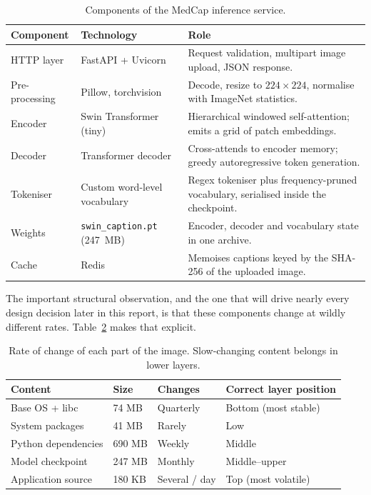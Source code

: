 \documentclass[10pt,a4paper]{article}
\newcommand{\cmd}[1]{\texttt{\small #1}}
\begin{document}
\begin{table}[htbp]
\centering
\caption{Components of the MedCap inference service.}
\label{tab:appcomp}
\footnotesize
\begin{tabularx}{\linewidth}{@{}l l X@{}}
\toprule
\textbf{Component} & \textbf{Technology} & \textbf{Role} \\
\midrule
HTTP layer      & FastAPI + Uvicorn & Request validation, multipart image upload, JSON response. \\
Pre-processing  & Pillow, torchvision & Decode, resize to $224\times224$, normalise with ImageNet statistics. \\
Encoder         & Swin Transformer (tiny) & Hierarchical windowed self-attention; emits a grid of patch embeddings. \\
Decoder         & Transformer decoder & Cross-attends to encoder memory; greedy autoregressive token generation. \\
Tokeniser       & Custom word-level vocabulary & Regex tokeniser plus frequency-pruned vocabulary, serialised inside the checkpoint. \\
Weights         & \cmd{swin\_caption.pt} (247~MB) & Encoder, decoder and vocabulary state in one archive. \\
Cache           & Redis & Memoises captions keyed by the SHA-256 of the uploaded image. \\
\bottomrule
\end{tabularx}
\end{table}

The important structural observation, and the one that will drive nearly
every design decision later in this report, is that these components
change at wildly different rates. Table~\ref{tab:churn} makes that
explicit.

\begin{table}[htbp]
\centering
\caption{Rate of change of each part of the image. Slow-changing content
belongs in lower layers.}
\label{tab:churn}
\footnotesize
\begin{tabularx}{\linewidth}{@{}l l l X@{}}
\toprule
\textbf{Content} & \textbf{Size} & \textbf{Changes} & \textbf{Correct layer position} \\
\midrule
Base OS + libc          & 74 MB  & Quarterly       & Bottom (most stable) \\
System packages         & 41 MB  & Rarely          & Low \\
Python dependencies     & 690 MB & Weekly          & Middle \\
Model checkpoint        & 247 MB & Monthly         & Middle--upper \\
Application source      & 180 KB & Several / day   & Top (most volatile) \\
\bottomrule
\end{tabularx}
\end{table}
\end{document}
